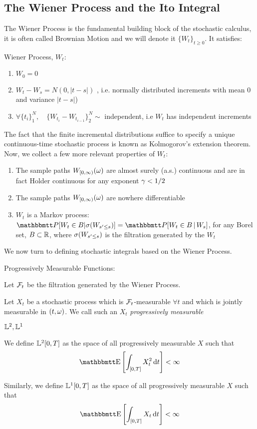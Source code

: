 \subsection{The Wiener Process and the Ito Integral}
The Wiener Process is the fundamental building block of the stochastic calculus,
it is often called Brownian Motion and we will denote it $\{W_t\}_{t\geq 0}$. It
satisfies:
\begin{defn}Wiener Process, $W_t$:
\begin{enumerate}
  \item $W_0 = 0$
  \item $W_t - W_s = N(0, |t-s|)$ , i.e. normally distributed increments with
  mean 0 and variance $|t-s|$)
  \item $\forall \{t_i\}_1^N, \quad \{W_{t_i} - W_{t_{i-1}} \}_2^N \sim$
  independent, i.e $W_t$ has independent increments
\end{enumerate}
\end{defn}
The fact that the finite incremental distributions suffice to specify a unique
continuous-time stochastic process is known as Kolmogorov's extension theorem.
Now, we collect a few more relevant properties of $W_t$:
\begin{enumerate}
  \item The sample paths $W_{[0,\infty)}({\omega})$
are almost surely (a.s.) continuous and are in fact Holder continuous for any
exponent ${\gamma } < 1/2$
\item The sample paths $W_{[0,\infty)}({\omega})$ are nowhere differentiable
\item $W_t$ is a Markov process: $\Prob[W_t \in B | \s(W_{s' \leq s })] =
\Prob[W_t \in B \,| \,W_s]$, for any Borel set, $B \subset { \mathbb{R} }$, where $\sigma(W_{s'
\leq s })$ is the filtration generated by the $W_t$
\end{enumerate}



We now turn to defining stochastic integrals based on the Wiener Process.
 
\begin{defn} Progressively Measurable Functions:

Let ${\mathcal{F}}_t$ be the filtration generated by the Wiener Process.

Let $X_t$ be a stochastic process which is ${\mathcal{F}}_t$-measurable $\forall t$ and
which is jointly measurable in $(t,{\omega})$. We call such an $X_t$
\emph{progressively measurable}
\end{defn}

\begin{defn} ${\mathbb{L}^2}, {\mathbb{L}^1}$

We define ${\mathbb{L}^2}[0,T]$ as the space of all progressively measurable
$X$ such that
\begin{equation*}
\Exp \left[ \int_{[0,T]} X_t^2 \intd{t} \right] < \infty
\end{equation*}

Similarly, we define ${\mathbb{L}^1}[0,T]$ as the space of all progressively measurable
$X$ such that
\begin{equation*}
\Exp \left[ \int_{[0,T]} X_t \intd{t} \right] < \infty
\end{equation*} 
\end{defn}

